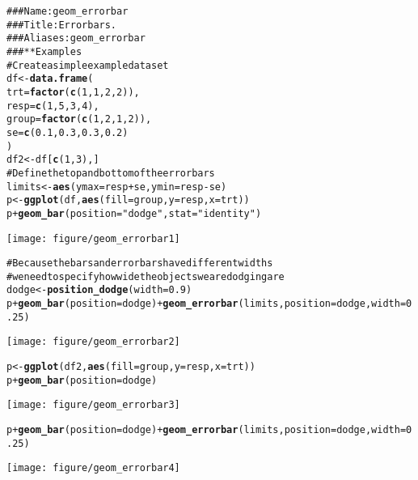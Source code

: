 \documentclass[a4paper,titlepage]{tufte-handout}\usepackage{graphicx, color}
\makeatletter
\def\maxwidth{ %
  \ifdim\Gin@nat@width>\linewidth
    \linewidth
  \else
    \Gin@nat@width
  \fi
}
\newcommand{\hlfunctioncall}[1]{\textcolor[rgb]{0.501960784313725,0,0.329411764705882}{\textbf{#1}}}%
\newcommand{\hlstring}[1]{\textcolor[rgb]{0.6,0.6,1}{#1}}%
\newcommand{\hlcomment}[1]{\textcolor[rgb]{0.180392156862745,0.6,0.341176470588235}{#1}}%
\newenvironment{kframe}{%
 \def\at@end@of@kframe{}%
 \ifinner\ifhmode%
  \def\at@end@of@kframe{\end{minipage}}%
  \begin{minipage}{\columnwidth}%
 \fi\fi%
 \def\FrameCommand##1{\hskip\@totalleftmargin \hskip-\fboxsep
 \colorbox{shadecolor}{##1}\hskip-\fboxsep
     \hskip-\linewidth \hskip-\@totalleftmargin \hskip\columnwidth}%
 \MakeFramed {\advance\hsize-\width
   \@totalleftmargin\z@ \linewidth\hsize
   \@setminipage}}%
 {\par\unskip\endMakeFramed%
 \at@end@of@kframe}
\newenvironment{knitrout}{}{} %
\makeatother
\begin{document}
\begin{knitrout}
\color{fgcolor}\begin{kframe}
\begin{alltt}
\hlcomment{### Name: geom_errorbar}
\hlcomment{### Title: Error bars.}
\hlcomment{### Aliases: geom_errorbar}
\hlcomment{### ** Examples}
\hlcomment{# Create a simple example dataset}
df <- \hlfunctioncall{data.frame}(
  trt = \hlfunctioncall{factor}(\hlfunctioncall{c}(1, 1, 2, 2)),
  resp = \hlfunctioncall{c}(1, 5, 3, 4),
  group = \hlfunctioncall{factor}(\hlfunctioncall{c}(1, 2, 1, 2)),
  se = \hlfunctioncall{c}(0.1, 0.3, 0.3, 0.2)
)
df2 <- df[\hlfunctioncall{c}(1,3),]
\hlcomment{# Define the top and bottom of the errorbars}
limits <- \hlfunctioncall{aes}(ymax = resp + se, ymin=resp - se)
p <- \hlfunctioncall{ggplot}(df, \hlfunctioncall{aes}(fill=group, y=resp, x=trt))
p + \hlfunctioncall{geom_bar}(position=\hlstring{"dodge"}, stat=\hlstring{"identity"})
\end{alltt}
\end{kframe}\texttt{[image: figure/geom\_errorbar1]} \begin{kframe}\begin{alltt}
\hlcomment{# Because the bars and errorbars have different widths}
\hlcomment{# we need to specify how wide the objects we are dodging are}
dodge <- \hlfunctioncall{position_dodge}(width=0.9)
p + \hlfunctioncall{geom_bar}(position=dodge) + \hlfunctioncall{geom_errorbar}(limits, position=dodge, width=0.25)
\end{alltt}
\end{kframe}\texttt{[image: figure/geom\_errorbar2]} \begin{kframe}\begin{alltt}
p <- \hlfunctioncall{ggplot}(df2, \hlfunctioncall{aes}(fill=group, y=resp, x=trt))
p + \hlfunctioncall{geom_bar}(position=dodge)
\end{alltt}
\end{kframe}\texttt{[image: figure/geom\_errorbar3]} \begin{kframe}\begin{alltt}
p + \hlfunctioncall{geom_bar}(position=dodge) + \hlfunctioncall{geom_errorbar}(limits, position=dodge, width=0.25)
\end{alltt}
\end{kframe}\texttt{[image: figure/geom\_errorbar4]} \begin{kframe}\begin{alltt}

\end{alltt}
\end{kframe}
\end{knitrout}
\end{document}
